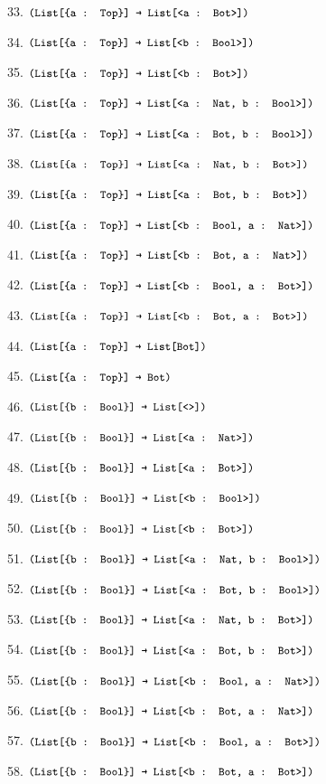 \documentclass[dvipsnames]{article}
\let\codeOrig\code
\renewcommand{\code}[2][]{%
  \ifmmode
    \if\relax\detokenize{#1}\relax
      \mathchoice{\mbox{\normalfont\small\ttfamily #2}}{\mbox{\normalfont\small\ttfamily #2}}{\mbox{\normalfont\small\ttfamily #2}}{\mbox{\normalfont\small\ttfamily #2}}%
    \else
      \mathchoice{\mbox{\normalfont\small\ttfamily #2}}{\mbox{\normalfont\small\ttfamily #2}}{\mbox{\normalfont\small\ttfamily #2}}{\mbox{\normalfont\small\ttfamily #2}}%
    \fi
  \else
    \codeOrig[#1]{#2}%
  \fi}
\begin{document}
\begin{enumerate}
      33. $\code{(List[\{a : Top\}] → List[<a : Bot>])}$

      34. $\code{(List[\{a : Top\}] → List[<b : Bool>])}$

      35. $\code{(List[\{a : Top\}] → List[<b : Bot>])}$

      36. $\code{(List[\{a : Top\}] → List[<a : Nat, b : Bool>])}$

      37. $\code{(List[\{a : Top\}] → List[<a : Bot, b : Bool>])}$

      38. $\code{(List[\{a : Top\}] → List[<a : Nat, b : Bot>])}$

      39. $\code{(List[\{a : Top\}] → List[<a : Bot, b : Bot>])}$

      40. $\code{(List[\{a : Top\}] → List[<b : Bool, a : Nat>])}$

      41. $\code{(List[\{a : Top\}] → List[<b : Bot, a : Nat>])}$

      42. $\code{(List[\{a : Top\}] → List[<b : Bool, a : Bot>])}$

      43. $\code{(List[\{a : Top\}] → List[<b : Bot, a : Bot>])}$

      44. $\code{(List[\{a : Top\}] → List[Bot])}$

      45. $\code{(List[\{a : Top\}] → Bot)}$

      46. $\code{(List[\{b : Bool\}] → List[<>])}$

      47. $\code{(List[\{b : Bool\}] → List[<a : Nat>])}$

      48. $\code{(List[\{b : Bool\}] → List[<a : Bot>])}$

      49. $\code{(List[\{b : Bool\}] → List[<b : Bool>])}$

      50. $\code{(List[\{b : Bool\}] → List[<b : Bot>])}$

      51. $\code{(List[\{b : Bool\}] → List[<a : Nat, b : Bool>])}$

      52. $\code{(List[\{b : Bool\}] → List[<a : Bot, b : Bool>])}$

      53. $\code{(List[\{b : Bool\}] → List[<a : Nat, b : Bot>])}$

      54. $\code{(List[\{b : Bool\}] → List[<a : Bot, b : Bot>])}$

      55. $\code{(List[\{b : Bool\}] → List[<b : Bool, a : Nat>])}$

      56. $\code{(List[\{b : Bool\}] → List[<b : Bot, a : Nat>])}$

      57. $\code{(List[\{b : Bool\}] → List[<b : Bool, a : Bot>])}$

      58. $\code{(List[\{b : Bool\}] → List[<b : Bot, a : Bot>])}$


\end{enumerate}
\end{document}
